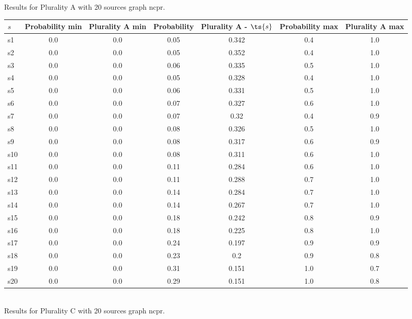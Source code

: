 \documentclass{article}
\begin{document}
\noindent Results for Plurality A with 20 sources graph ncpr.

\noindent\begin{tabular}{|l|c|c|c|c|c|c|}
\hline
$s$& Probability min & Plurality A min & Probability & Plurality A - $\ts{s}$ & Probability max & Plurality A max\\
\hline
s1 &0.0 & 0.0 & 0.05 & 0.342 & 0.4 & 1.0\\
\hline
s2 &0.0 & 0.0 & 0.05 & 0.352 & 0.4 & 1.0\\
\hline
s3 &0.0 & 0.0 & 0.06 & 0.335 & 0.5 & 1.0\\
\hline
s4 &0.0 & 0.0 & 0.05 & 0.328 & 0.4 & 1.0\\
\hline
s5 &0.0 & 0.0 & 0.06 & 0.331 & 0.5 & 1.0\\
\hline
s6 &0.0 & 0.0 & 0.07 & 0.327 & 0.6 & 1.0\\
\hline
s7 &0.0 & 0.0 & 0.07 & 0.32 & 0.4 & 0.9\\
\hline
s8 &0.0 & 0.0 & 0.08 & 0.326 & 0.5 & 1.0\\
\hline
s9 &0.0 & 0.0 & 0.08 & 0.317 & 0.6 & 0.9\\
\hline
s10 &0.0 & 0.0 & 0.08 & 0.311 & 0.6 & 1.0\\
\hline
s11 &0.0 & 0.0 & 0.11 & 0.284 & 0.6 & 1.0\\
\hline
s12 &0.0 & 0.0 & 0.11 & 0.288 & 0.7 & 1.0\\
\hline
s13 &0.0 & 0.0 & 0.14 & 0.284 & 0.7 & 1.0\\
\hline
s14 &0.0 & 0.0 & 0.14 & 0.267 & 0.7 & 1.0\\
\hline
s15 &0.0 & 0.0 & 0.18 & 0.242 & 0.8 & 0.9\\
\hline
s16 &0.0 & 0.0 & 0.18 & 0.225 & 0.8 & 1.0\\
\hline
s17 &0.0 & 0.0 & 0.24 & 0.197 & 0.9 & 0.9\\
\hline
s18 &0.0 & 0.0 & 0.23 & 0.2 & 0.9 & 0.8\\
\hline
s19 &0.0 & 0.0 & 0.31 & 0.151 & 1.0 & 0.7\\
\hline
s20 &0.0 & 0.0 & 0.29 & 0.151 & 1.0 & 0.8\\
\hline
\end{tabular}\\

\noindent Results for Plurality C with 20 sources graph ncpr.
\end{document}
